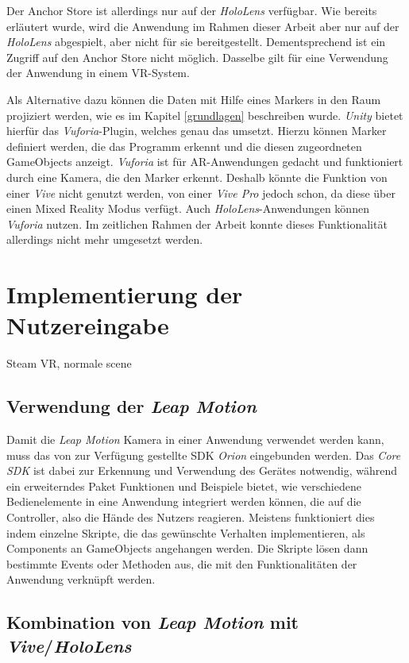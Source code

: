 Der Anchor Store ist allerdings nur auf der \textit{HoloLens} verfügbar. Wie bereits erläutert wurde, wird die Anwendung im Rahmen dieser Arbeit aber nur auf der \textit{HoloLens} abgespielt, aber nicht für sie bereitgestellt. Dementsprechend ist ein Zugriff auf den Anchor Store nicht möglich. Dasselbe gilt für eine Verwendung der Anwendung in einem VR-System.

Als Alternative dazu können die Daten mit Hilfe eines Markers in den Raum projiziert werden, wie es im Kapitel \ref{grundlagen} beschreiben wurde. \textit{Unity} bietet hierfür das \textit{Vuforia}-Plugin, welches genau das umsetzt. Hierzu können Marker definiert werden, die das Programm erkennt und die diesen zugeordneten GameObjects anzeigt. 
\textit{Vuforia} ist für AR-Anwendungen gedacht und funktioniert durch eine Kamera, die den Marker erkennt. Deshalb könnte die Funktion von einer \textit{Vive} nicht genutzt werden, von einer \textit{Vive Pro} jedoch schon, da diese über einen Mixed Reality Modus verfügt. Auch \textit{HoloLens}-Anwendungen können \textit{Vuforia} nutzen. 
Im zeitlichen Rahmen der Arbeit konnte dieses Funktionalität allerdings nicht mehr umgesetzt werden.

\section{Implementierung der Nutzereingabe}
Steam VR, normale scene


\subsection{Verwendung der \textit{Leap Motion}}

Damit die \textit{Leap Motion} Kamera in einer Anwendung verwendet werden kann, muss das von \cite{orion} zur Verfügung gestellte SDK \textit{Orion} eingebunden werden. Das \textit{Core SDK} ist dabei zur Erkennung und Verwendung des Gerätes notwendig, während ein erweiterndes Paket Funktionen und Beispiele bietet, wie verschiedene Bedienelemente in eine Anwendung integriert werden können, die auf die Controller, also die Hände des Nutzers reagieren.
Meistens funktioniert dies indem einzelne Skripte, die das gewünschte Verhalten implementieren, als Components an GameObjects angehangen werden. Die Skripte lösen dann bestimmte Events oder Methoden aus, die mit den Funktionalitäten der Anwendung verknüpft werden. 

\subsection{Kombination von \textit{Leap Motion} mit \textit{Vive}/\textit{HoloLens}}
\label{kombination}

